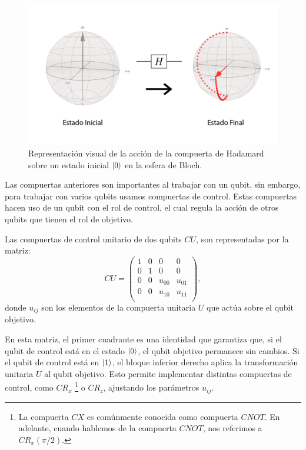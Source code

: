 \documentclass[letterpaper,12pt]{thesisECFM}
\theoremstyle{plain}
\theoremstyle{definition}
\theoremstyle{definition}
\theoremstyle{remark}
\newcommand{\1}{\mathbb{1}}
\begin{document}
\begin{figure}
    \centering
    \includegraphics[scale=0.15]{imagenes/Haddamard.png}
    \caption{Representación visual de la acción de la compuerta de Hadamard sobre un estado inicial $\ket{0}$ en la esfera de Bloch.}
    \label{fig:hadamard}
\end{figure}

Las compuertas anteriores son importantes al trabajar con un qubit, sin
embargo, para trabajar con varios qubits usamos compuertas de control.
Estas compuertas hacen uso de un qubit con el rol de  control, el cual
regula la acción de otros qubits que tienen el rol de objetivo.

Las compuertas de control unitario de dos qubits $CU$, son representadas por la matriz:
\begin{equation}
    CU = 
    \begin{pmatrix}
    \label{ec:2.27}
    1 & 0 & 0 & 0 \\
    0 & 1 & 0 & 0 \\
     0& 0 & u_{00} & u_{01} \\
     0&  0&  u_{10}&u_{11} \\
    \end{pmatrix},
\end{equation}
donde $u_{ij}$ son los elementos de la compuerta unitaria $U$ que actúa sobre el qubit objetivo.

En esta matriz, el primer cuadrante es una identidad que garantiza que, si el qubit de control está en el estado $\ket{0}$, el qubit objetivo permanece sin cambios. Si el qubit de control está en $\ket{1}$, el bloque inferior derecho aplica la transformación unitaria $U$ al qubit objetivo. Esto permite implementar distintas compuertas de control, como $CR_x$ \footnote{La compuerta $CX$ es comúnmente conocida como compuerta $CNOT$. En adelante, cuando hablemos de la compuerta $CNOT$, nos referimos a $CR_x(\pi/2)$.}  o $CR_z$, ajustando los parámetros $u_{ij}$.
\end{document}
